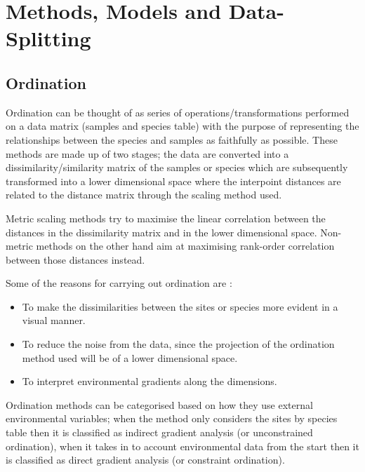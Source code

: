 
\chapter{Methods, Models and Data-Splitting}

\ifpdf
    \graphicspath{{Chapter2/Figs/Raster/}{Chapter2/Figs/PDF/}{Chapter2/Figs/}}
\else
    \graphicspath{{Chapter2/Figs/Vector/}{Chapter2/Figs/}}
\fi


\section{Ordination}

Ordination can be thought of as series of operations/transformations performed on a data matrix (samples and species table) with the purpose of representing the relationships between the species and samples as faithfully as possible. These methods are made up of two stages; the data are converted into a dissimilarity/similarity matrix of the samples or species which are subsequently transformed into a lower dimensional space where the interpoint distances are related to the distance matrix through the scaling method used.

Metric scaling methods try to maximise the linear correlation between the distances in the dissimilarity matrix and in the lower dimensional space. Non-metric methods on the other hand aim at maximising rank-order correlation between those distances instead.

Some of the reasons for carrying out ordination are :
\begin{itemize}
\item To make the dissimilarities between the sites or species more evident in a visual manner.
\item To reduce the noise from the data, since the projection of the ordination method used will be of a lower dimensional space.
\item To interpret environmental gradients along the dimensions.
\end{itemize}


Ordination methods can be categorised based on how they use external environmental variables; when the method only considers the sites by species table then it is classified as indirect gradient analysis (or unconstrained ordination), when it takes in to account environmental data from the start then it is classified as direct gradient analysis (or constraint ordination). 

